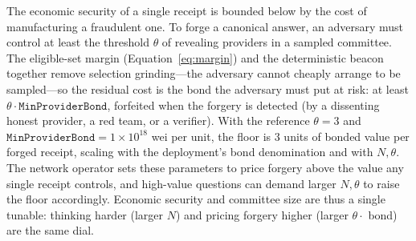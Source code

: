The economic security of a single \PoT{} receipt is bounded below by the cost of manufacturing a fraudulent one. To forge a canonical answer, an adversary must control at least the threshold $\theta$ of revealing providers in a sampled committee. The eligible-set margin (Equation~\ref{eq:margin}) and the deterministic beacon together remove selection grinding---the adversary cannot cheaply arrange to be sampled---so the residual cost is the bond the adversary must put at risk: at least $\theta \cdot \texttt{MinProviderBond}$, forfeited when the forgery is detected (by a dissenting honest provider, a red team, or a verifier). With the reference $\theta{=}3$ and $\texttt{MinProviderBond}=1{\times}10^{18}$ wei per unit, the floor is $3$ units of bonded value per forged receipt, scaling with the deployment's bond denomination and with $N,\theta$. The network operator sets these parameters to price forgery above the value any single receipt controls, and high-value questions can demand larger $N,\theta$ to raise the floor accordingly. Economic security and committee size are thus a single tunable: thinking harder (larger $N$) and pricing forgery higher (larger $\theta \cdot$ bond) are the same dial.

